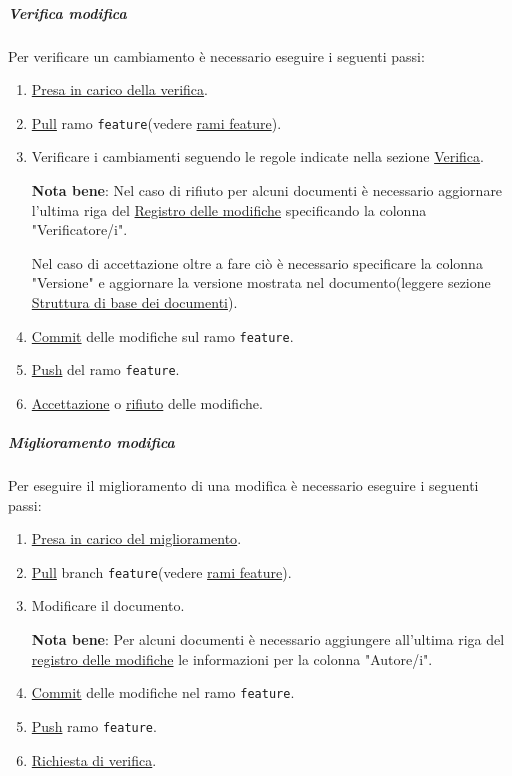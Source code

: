 \subparagraph{Verifica modifica}
Per verificare un cambiamento è necessario eseguire i seguenti passi:
\begin{enumerate}
    \item \hyperref[subpar:presa_carico_verifica]{Presa in carico della verifica}.
    
    \item \hyperref[subpar:pull]{Pull} ramo \texttt{feature}(vedere \hyperref[item:rami_feature]{rami feature}).
    
    \item Verificare i cambiamenti seguendo le regole indicate nella sezione \hyperref[subsec:proc_verifica]{Verifica}.
    
    \textbf{Nota bene}: Nel caso di rifiuto per alcuni documenti è necessario aggiornare l'ultima riga del \hyperref[par:registro_delle_modifiche]{Registro delle modifiche} specificando la colonna "Verificatore/i".

    Nel caso di accettazione oltre a fare ciò è necessario specificare la colonna "Versione" e aggiornare la versione mostrata nel documento(leggere sezione \hyperref[par:struttura_di_base_documenti]{Struttura di base dei documenti}).

    \item \hyperref[subpar:commit]{Commit} delle modifiche sul ramo \texttt{feature}.
    
    \item \hyperref[subpar:push]{Push} del ramo \texttt{feature}.

    \item \hyperref[subpar:accettazione_modifiche]{Accettazione} o \hyperref[subpar:rifiuto_modifiche]{rifiuto} delle modifiche.
\end{enumerate}

\subparagraph{Miglioramento modifica}
  
Per eseguire il miglioramento di una modifica è necessario eseguire i seguenti passi:
\begin{enumerate}
\item \hyperref[subpar:presa_carico_modifica]{Presa in carico del miglioramento}.

\item \hyperref[subpar:pull]{Pull} branch \texttt{feature}(vedere \hyperref[item:rami_feature]{rami feature}).

\item Modificare il documento.

\textbf{Nota bene}: Per alcuni documenti è necessario aggiungere all'ultima riga del \hyperref[par:registro_delle_modifiche]{registro delle modifiche} le informazioni per la colonna "Autore/i". 

\item \hyperref[subpar:commit]{Commit} delle modifiche nel ramo \texttt{feature}.

\item \hyperref[subpar:push]{Push} ramo \texttt{feature}.

\item \hyperref[subpar:github_richiesta_di_verifica]{Richiesta di verifica}.
\end{enumerate}

